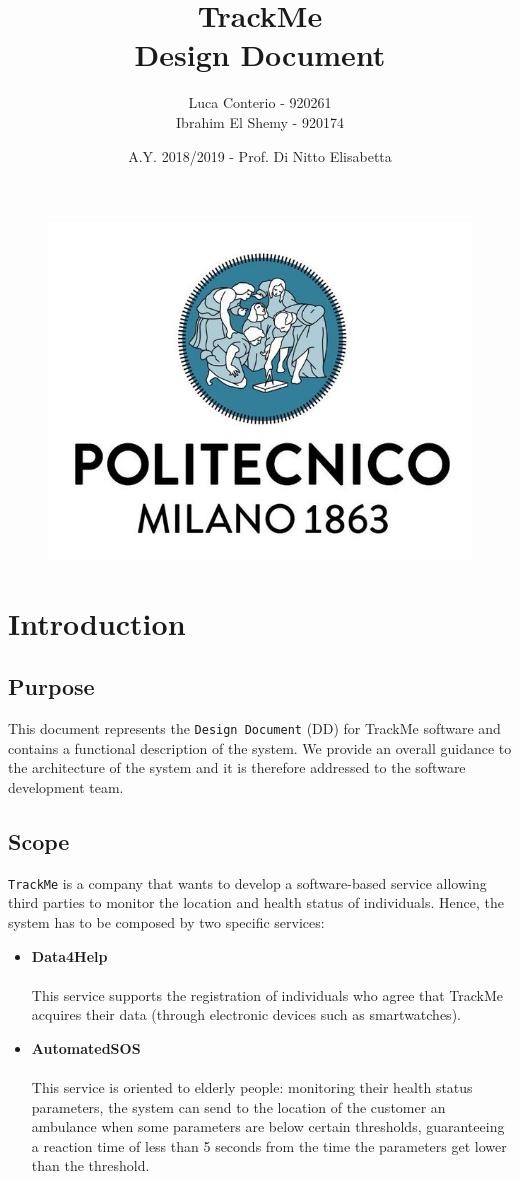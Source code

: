 \documentclass[12pt,a4paper]{article}
\author{Luca Conterio - 920261\\
	Ibrahim El Shemy - 920174}
\date{A.Y. 2018/2019 - Prof. Di Nitto Elisabetta}
\title{%
	\textbf{\Huge{TrackMe}} \\
	\large Design Document
}
\begin{document}
	\begin{figure}
		\centering
		\includegraphics[width=1.0\linewidth]{images/polimi}
	\end{figure}
	\maketitle

	\newpage
	\tableofcontents
	\newpage

	\section{Introduction}
	\subsection{Purpose}
	This document represents the \texttt{Design Document} (DD) for TrackMe software and contains a functional description of the system. We provide an overall guidance to the architecture of the system and it is therefore addressed to the software development team.
	\subsection{Scope}
	\texttt{TrackMe} is a company that wants to develop a software-based service allowing third parties to monitor the location and health status of individuals. Hence, the system has to be composed by two specific services:
	\begin{itemize}
	 	\item \textbf{Data4Help}\\\\
	 	This service supports the registration of individuals who agree that TrackMe acquires their data (through electronic devices such as smartwatches).
	 	\item \textbf{AutomatedSOS}\\\\ 
	 	This service is oriented to elderly people: monitoring their health status parameters, the system can send to the location of the customer an ambulance when some parameters are below certain thresholds, guaranteeing a reaction time of less than 5 seconds from the time the parameters get lower than the threshold.
	\end{itemize}
\end{document}
